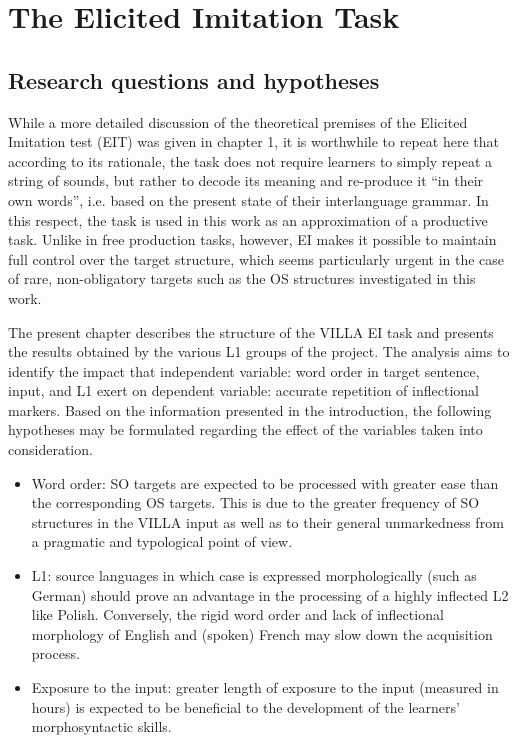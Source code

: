 \chapter{The Elicited Imitation Task}\label{sec:3}

\section{Research questions and hypotheses}\label{sec:04:1}

While a more detailed discussion of the theoretical premises of the Elicited Imitation test (EIT) was given in chapter 1, it is worthwhile to repeat here that according to its rationale, the task does not require learners to simply repeat a string of sounds, but rather to decode its meaning and re-produce it ``in their own words'', i.e. based on the present state of their interlanguage grammar. In this respect, the task is used in this work as an approximation of a productive task. Unlike in free production tasks, however, EI makes it possible to maintain full control over the target structure, which seems particularly urgent in the case of rare, non-obligatory targets such as the OS structures investigated in this work.

The present chapter describes the structure of the VILLA EI task and presents the results obtained by the various L1 groups of the project. The analysis aims to identify the impact that independent variable: word order in target sentence, input, and L1 exert on dependent variable: accurate repetition of inflectional markers. Based on the information presented in the introduction, the following hypotheses may be formulated regarding the effect of the variables taken into consideration.

\begin{itemize}
    \item Word order: SO targets are expected to be processed with greater ease than the corresponding OS targets. This is due to the greater frequency of SO structures in the VILLA input as well as to their general unmarkedness from a pragmatic and typological point of view.
    \item L1: source languages in which case is expressed morphologically (such as German) should prove an advantage in the processing of a highly inflected L2 like Polish. Conversely, the rigid word order and lack of inflectional morphology of English and (spoken) French may slow down the acquisition process.
    \item Exposure to the input: greater length of exposure to the input (measured in hours) is expected to be beneficial to the development of the learners’ morphosyntactic skills.
\end{itemize}

